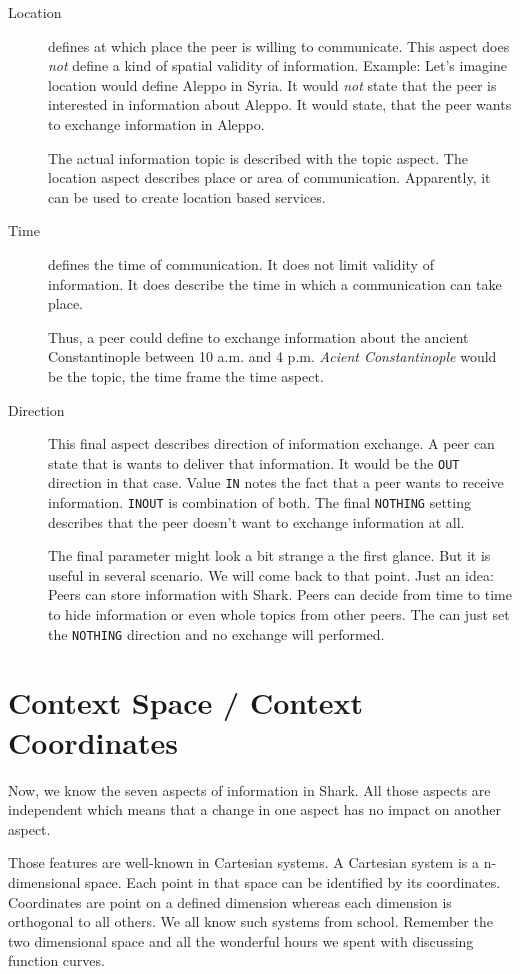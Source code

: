 \begin{description}
    \item[Location] 
defines at which place the peer is willing to communicate. This aspect does {\it not} define a kind of spatial validity of information. Example: Let's imagine location would define Aleppo in Syria. It would {\it not} state that the peer is interested in information about Aleppo. It would state, that the peer wants to exchange information in Aleppo.

The actual information topic is described with the topic aspect. The location aspect describes place or area of communication. Apparently, it can be used to create location based services.

    \item[Time] 
defines the time of communication. It does not limit validity of information. It does describe the time in which a communication can take place.

Thus, a peer could define to exchange information about the ancient Constantinople between 10 a.m. and 4 p.m. {\it Acient Constantinople} would be the topic, the time frame the time aspect.

    \item[Direction] 
This final aspect describes direction of information exchange. A peer can state that is wants to deliver that information. It would be the {\tt OUT} direction in that case. Value {\tt IN} notes the fact that a peer wants to receive information. {\tt INOUT} is combination of both. The final {\tt NOTHING} setting describes that the peer doesn't want to exchange information at all.

The final parameter might look a bit strange a the first glance. But it is useful in several scenario. We will come back to that point. Just an idea: Peers can store information with Shark. Peers can decide from time to time to hide information or even whole topics from other peers. The can just set the {\tt NOTHING} direction and no exchange will performed.

\end{description}

\section{Context Space / Context Coordinates}

Now, we know the seven aspects of information in Shark. All those aspects are independent which means that a change in one aspect has no impact on another aspect. 

Those features are well-known in Cartesian systems. A Cartesian system is a n-dimensional space. Each point in that space can be identified by its coordinates. Coordinates are point on a defined dimension whereas each dimension is orthogonal to all others. We all know such systems from school. Remember the two dimensional space and all the wonderful hours we spent with discussing
function curves.

